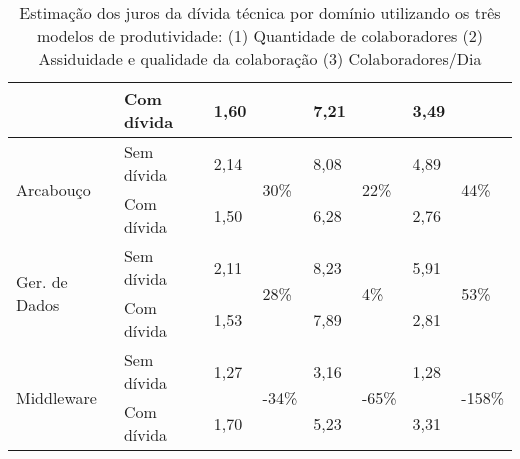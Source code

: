 \begin{table}[H]
\begin{tabular}{|l|l|l|l|l|l|l|l|}
                               & Com dívida           & 1,60            &                        & 7,21            &                         & 3,49            &                         \\ \hline
\multirow{2}{*}{Arcabouço}     & Sem dívida              & 2,14            & \multirow{2}{*}{30\%}  & 8,08            & \multirow{2}{*}{22\%}   & 4,89            & \multirow{2}{*}{44\%}   \\ \cline{2-3} \cline{5-5} \cline{7-7}
                               & Com dívida           & 1,50            &                        & 6,28            &                         & 2,76            &                         \\ \hline
\multirow{2}{*}{Ger. de Dados} & Sem dívida              & 2,11            & \multirow{2}{*}{28\%}  & 8,23            & \multirow{2}{*}{4\%}    & 5,91            & \multirow{2}{*}{53\%}   \\ \cline{2-3} \cline{5-5} \cline{7-7}
                               & Com dívida           & 1,53            &                        & 7,89            &                         & 2,81            &                         \\ \hline
\multirow{2}{*}{Middleware}    & Sem dívida              & 1,27            & \multirow{2}{*}{-34\%} & 3,16            & \multirow{2}{*}{-65\%}  & 1,28            & \multirow{2}{*}{-158\%} \\ \cline{2-3} \cline{5-5} \cline{7-7}
                               & Com dívida           & 1,70            &                        & 5,23            &                         & 3,31            &                         \\ \hline
\end{tabular}
\caption{Estimação dos juros da dívida técnica por domínio utilizando os três modelos de produtividade: (1) Quantidade de colaboradores (2) Assiduidade e qualidade da colaboração (3) Colaboradores/Dia}
\label{tab:estimacao_juros_dominio_analise}
\end{table}

